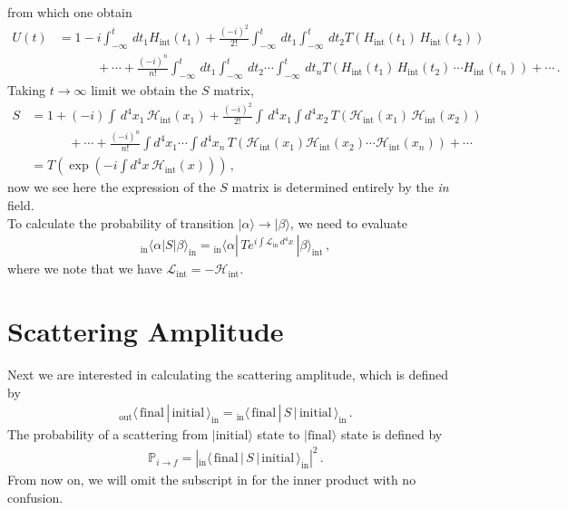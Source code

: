 \documentclass[11pt, onesided]{book}
\theoremstyle{break}
\theoremstyle{break}
\begin{document}
from which one obtain
\begin{align*}
U(t) &= 1-i \int_{-\infty}^t \, dt_1 H_{\text{int}}(t_1) + \frac{(-i)^2}{2!}\int_{-\infty}^t \,dt_1\int_{-\infty}^t\, dt_2 T\left( H_{\text{int}}(t_1) \, H_{\text{int}}(t_2)\right) \\
&{}\qquad\quad + \cdots + \frac{(-i)^n}{n!} \int_{-\infty}^t\, dt_1 \int_{-\infty}^{t}\, dt_2\cdots\int_{-\infty}^{t}\, dt_n T\left( H_{\text{int}}(t_1)\,H_{\text{int}}(t_2)\,\cdots H_{\text{int}}(t_n)\right)+\cdots \,.
\end{align*}
Taking $t \to \infty$ limit we obtain the $S$ matrix, 
\begin{align*}
S &= 1 + (-i) \int\, d^4x_1\, \mathcal{H}_{\text{int}}(x_1) 
+ \frac{(-i)^2}{2!}\int \, d^4x_1 \int d^4x_2 \, T\left(\mathcal{H}_{\text{int}}(x_1)\, \mathcal{H}_{\text{int}}(x_2) \right) 
\\
&{}\qquad\quad + \cdots 
+ \frac{(-i)^n}{n!}\int d^4x_1 \cdots \int d^4x_n\, T\left( \mathcal{H}_{\text{int}}(x_1)\mathcal{H}_{\text{int}}(x_2) \cdots \mathcal{H}_{\text{int}}(x_n) \right)+\cdots\\
&= T\left( \exp\left(-i \int d^4x\, \mathcal{H}_{\text{int}}(x)\right)
\right)\,,
\end{align*}
now we see here the expression of the $S$ matrix is determined entirely by the \textit{in} field.\\

To calculate the probability of transition $|\alpha\rangle \to |\beta\rangle$, we need to evaluate
\begin{align*}
{}_\text{in}\langle \alpha | S | \beta\rangle_{\text{in}}= {}_\text{in}\langle \alpha | \, Te^{i \int \mathcal{L}_{\text{in}}\, d^4x}\, | \beta\rangle_{\text{int}}\,,
\end{align*}
where we note that we have $\mathcal{L}_{\text{int}} = -\mathcal{H}_{\text{int}}$.

\section[Scattering Amplitude]{\color{red}Scattering Amplitude\color{black}}
Next we are interested in calculating the scattering amplitude, which is defined by
\begin{align*}
{}_{\text{out}}\langle\, \text{final}\, |\, \text{initial}\,\rangle_{\text{in}} = {}_{\text{in}}\langle\, \text{final}\, |\,S\, |\,\text{initial}\, \rangle_{\text{in}}\,.
\end{align*}
The probability of a scattering from $|\text{initial}\rangle$ state to $|\text{final}\rangle$ state is defined by
\begin{align*}
\mathbb{P}_{i\to f} =  \left|{}_{\text{in}}\langle\, \text{final}\, |\,S\, |\,\text{initial}\, \rangle_{\text{in}}\right|^2\,.
\end{align*}
From now on, we will omit the subscript $\text{in}$ for the inner product with no confusion. \\
\end{document}
